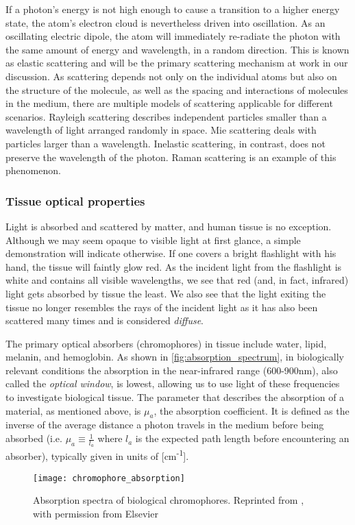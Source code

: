 If a photon's energy is not high enough to cause a transition to a higher energy state, the atom's electron cloud is nevertheless driven into oscillation. As an oscillating electric dipole, the atom will immediately re-radiate the photon with the same amount of energy and wavelength, in a random direction. This is known as elastic scattering and will be the primary scattering mechanism at work in our discussion. As scattering depends not only on the individual atoms but also on the structure of the molecule, as well as the spacing and interactions of molecules in the medium, there are multiple models of scattering applicable for different scenarios.  Rayleigh scattering describes independent particles smaller than a wavelength of light arranged randomly in space. Mie scattering deals with particles larger than a wavelength. Inelastic scattering, in contrast, does not preserve the wavelength of the photon. Raman scattering is an example of this phenomenon.


\subsubsection{Tissue optical properties}
Light is absorbed and scattered by matter, and human tissue is no exception. Although we may seem opaque to visible light at first glance, a simple demonstration will indicate otherwise. If one covers a bright flashlight with his hand, the tissue will faintly glow red. As the incident light from the flashlight is white and contains all visible wavelengths, we see that red (and, in fact, infrared) light gets absorbed by tissue the least. We also see that the light exiting the tissue no longer resembles the rays of the incident light as it has also been scattered many times and is considered \emph{diffuse}. 

The primary optical absorbers (chromophores) in tissue include water, lipid, melanin, and hemoglobin. As shown in \autoref{fig:absorption_spectrum}, in biologically relevant conditions the absorption in the near-infrared range  (600-900nm), also called the \emph{optical window}, is lowest, allowing us to use light of these frequencies to investigate biological tissue. The parameter that describes the absorption of a material, as mentioned above, is $\mu_a$, the absorption coefficient. It is defined as the inverse of the average distance a photon travels in the medium before being absorbed (i.e. $\mu_a \equiv \frac{1}{l_a}$ where $l_a$ is the expected path length before encountering an absorber), typically given in units of [cm\textsuperscript{-1}]. 
\begin{figure}[tb]
    \centering
    \texttt{[image: chromophore\_absorption]}
    \caption{Absorption spectra of biological chromophores. Reprinted from \cite{Scholkmann2013}, with permission from Elsevier}
    \label{fig:absorption_spectrum}
\end{figure}

